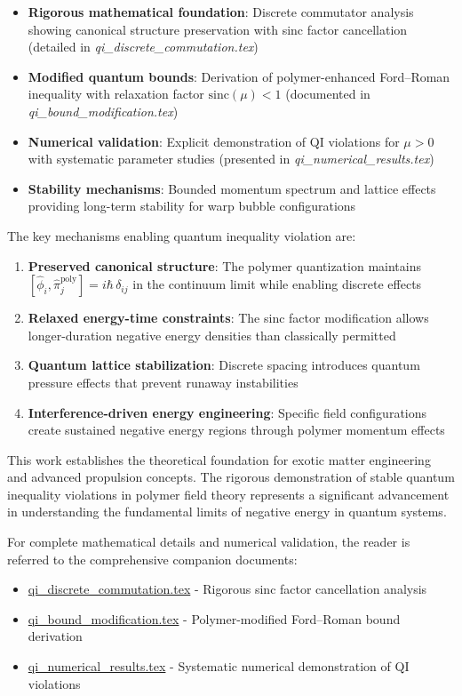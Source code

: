 \documentclass[12pt]{article}
\begin{document}
\begin{itemize}
\item \textbf{Rigorous mathematical foundation}: Discrete commutator analysis showing canonical structure preservation with sinc factor cancellation (detailed in \textit{qi\_discrete\_commutation.tex})
\item \textbf{Modified quantum bounds}: Derivation of polymer-enhanced Ford–Roman inequality with relaxation factor $\text{sinc}(\mu) < 1$ (documented in \textit{qi\_bound\_modification.tex})
\item \textbf{Numerical validation}: Explicit demonstration of QI violations for $\mu > 0$ with systematic parameter studies (presented in \textit{qi\_numerical\_results.tex})
\item \textbf{Stability mechanisms}: Bounded momentum spectrum and lattice effects providing long-term stability for warp bubble configurations
\end{itemize}

The key mechanisms enabling quantum inequality violation are:

\begin{enumerate}
\item \textbf{Preserved canonical structure}: The polymer quantization maintains $[\hat{\phi}_i, \hat{\pi}_j^{\text{poly}}] = i\hbar\,\delta_{ij}$ in the continuum limit while enabling discrete effects
\item \textbf{Relaxed energy-time constraints}: The sinc factor modification allows longer-duration negative energy densities than classically permitted
\item \textbf{Quantum lattice stabilization}: Discrete spacing introduces quantum pressure effects that prevent runaway instabilities
\item \textbf{Interference-driven energy engineering}: Specific field configurations create sustained negative energy regions through polymer momentum effects
\end{enumerate}

This work establishes the theoretical foundation for exotic matter engineering and advanced propulsion concepts. The rigorous demonstration of stable quantum inequality violations in polymer field theory represents a significant advancement in understanding the fundamental limits of negative energy in quantum systems.

For complete mathematical details and numerical validation, the reader is referred to the comprehensive companion documents:
\begin{itemize}
\item \href{file:qi_discrete_commutation.tex}{qi\_discrete\_commutation.tex} - Rigorous sinc factor cancellation analysis
\item \href{file:qi_bound_modification.tex}{qi\_bound\_modification.tex} - Polymer-modified Ford–Roman bound derivation  
\item \href{file:qi_numerical_results.tex}{qi\_numerical\_results.tex} - Systematic numerical demonstration of QI violations
\end{itemize}
\end{document}
